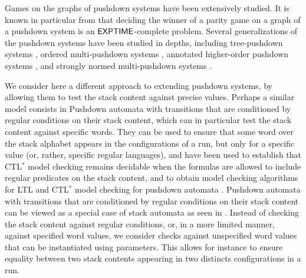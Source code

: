 \documentclass[a4paper,UKenglish,cleveref, autoref, thm-restate]{lipics-v2021}
\begin{document}
Games on the graphs of pushdown systems have been extensively studied.
It is known in particular from \cite{walukiewicz1996pushdown} that deciding the winner of a parity game on a graph of a pushdown system is an ${\sf EXPTIME}$-complete problem.
Several generalizations of the pushdown systems 
have been studied in depths, including
tree-pushdown systems \cite{guessarian1983pushdown}, ordered
multi-pushdown systems \cite{breveglieri1996multi, atig2012model}, annotated higher-order pushdown systems \cite{maslov1976multilevel, broadbent2012saturation}, and
strongly normed multi-pushdown systems \cite{czerwinski2012reachability}.




We consider here a different approach to extending pushdown systems, by allowing them to test the stack content against precise values.
Perhaps a similar model consists in 
Pushdown automata 
with transitions that are conditioned by regular conditions on their stack content, which
can in particular
test the
stack content against
specific words. 
They can be used to ensure that some word over the stack alphabet appears in the configurations of a run, but only for a specific value (or, rather, specific regular languages),
and have
been used to establish that CTL$^*$ model checking remains decidable
when the formulas are allowed to include regular predicates on the stack content,
and to obtain 
model checking algorithms for LTL and CTL$^*$ model checking
for
pushdown automata \cite{finkel1997direct}.
Pushdown automata 
with transitions that are conditioned by regular conditions on their stack content
can be viewed as
a special case of stack automata as seen in \cite{hopcroft1969formal}.
Instead
of checking the stack content against regular conditions, or, in a more limited manner,
against specified word values,
we consider
checks against unspecified word values that can be instantiated using parameters.
This allows for instance to ensure equality between two stack contents appearing in two distincts configurations in a run.
\end{document}
